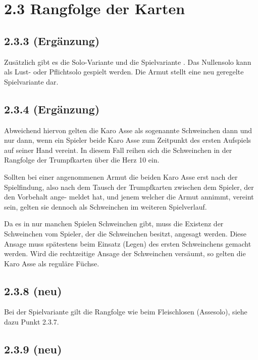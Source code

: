 \section*{2.3 Rangfolge der Karten}

\subsection*{2.3.3 (Ergänzung)}

Zusätzlich gibt es die Solo-Variante  und die
Spielvariante . Das Nullensolo kann als Lust- oder Pflichtsolo
gespielt werden. Die Armut stellt eine neu geregelte Spielvariante dar.

\subsection*{2.3.4 (Ergänzung)}

Abweichend hiervon gelten die Karo Asse als sogenannte Schweinchen dann
und nur dann, wenn ein Spieler beide Karo Asse zum Zeitpunkt des ersten
Aufspiels auf seiner Hand vereint. In diesem Fall reihen sich die
Schweinchen in der Rangfolge der Trumpfkarten über die Herz 10 ein.

Sollten bei einer angenommenen Armut die beiden Karo Asse erst nach der
Spielfindung, also nach dem Tausch der Trumpfkarten zwischen dem
Spieler, der den Vorbehalt ange- meldet hat, und jenem welcher die Armut
annimmt, vereint sein, gelten sie dennoch als Schweinchen im weiteren
Spielverlauf.

Da es in nur manchen Spielen Schweinchen gibt, muss die Existenz der
Schweinchen vom Spieler, der die Schweinchen besitzt, angesagt werden.
Diese Ansage muss spätestens beim Einsatz (Legen) des ersten
Schweinchens gemacht werden. Wird die rechtzeitige Ansage der
Schweinchen versäumt, so gelten die Karo Asse als reguläre Füchse.

\subsection*{2.3.8 (neu)}

Bei der Spielvariante  gilt die Rangfolge wie beim
Fleischlosen (Assesolo), siehe dazu Punkt 2.3.7.

\subsection*{2.3.9 (neu)}


